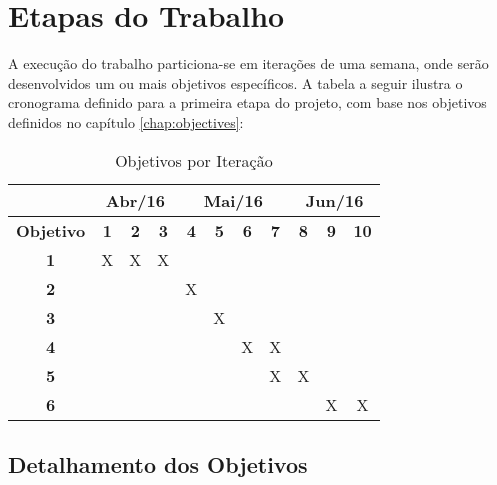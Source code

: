 \chapter{\label{chap:work-plan}Etapas do Trabalho}

A execução do trabalho particiona-se em iterações de uma semana, onde serão
desenvolvidos um ou mais objetivos específicos. A tabela a seguir ilustra o
cronograma definido para a primeira etapa do projeto, com base nos objetivos
definidos no capítulo \ref{chap:objectives}:

\begin{table}[htb!]
\centering
\caption{Objetivos por Iteração}
\label{tab:work-plan}
\begin{tabular}{c|c|c|c|c|c|c|c|c|c|c|}
\cline{2-11}
{\bf}                                 & \multicolumn{3}{c|}{{\bf Abr/16}} & \multicolumn{4}{c|}{{\bf Mai/16}}     & \multicolumn{3}{c|}{{\bf Jun/16}} \\ \hline
\multicolumn{1}{|c|}{{\bf Objetivo}}  & {\bf 1} & {\bf 2} & {\bf 3}	     & {\bf 4} & {\bf 5} & {\bf 6} & {\bf 7} & {\bf 8} & {\bf 9} & {\bf 10}      \\ \hline
\multicolumn{1}{|c|}{{\bf 1}}         & X       & X       & X             &         &         &         &         &         &         &               \\ \hline
\multicolumn{1}{|c|}{{\bf 2}}         &         &         &               & X       &         &         &         &         &         &               \\ \hline
\multicolumn{1}{|c|}{{\bf 3}}         &         &         &               &         & X       &         &         &         &         &               \\ \hline
\multicolumn{1}{|c|}{{\bf 4}}         &         &         &               &         &         &  X      & X       &         &         &               \\ \hline
\multicolumn{1}{|c|}{{\bf 5}}         &         &         &               &         &         &         & X       & X       &         &               \\ \hline
\multicolumn{1}{|c|}{{\bf 6}}         &         &         &               &         &         &         &         &         & X       & X             \\ \hline
\end{tabular}
\end{table}

\section{Detalhamento dos Objetivos}


